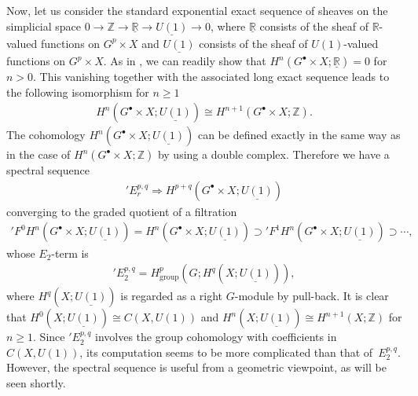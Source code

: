 \documentclass[pdftex]{sigma}
\theoremstyle{definition}
\newcommand{\R}{\mathbb{R}}
\newcommand{\Z}{\mathbb{Z}}
\begin{document}
Now, let us consider the standard exponential exact sequence of sheaves on the simplicial space
$0 \to \Z \to \underline{\R} \to \underline{U(1)} \to 0$, where $\underline{\R}$ consists of the sheaf of $\R$-valued functions on $G^p \times X$ and $\underline{U(1)}$ consists of the sheaf of $U(1)$-valued functions on $G^p \times X$. As in \cite[Lemma~4.4]{G2}, we can readily show that $H^n(G^\bullet \times X; \underline{\R}) = 0$ for $n > 0$. This vanishing together with the associated long exact sequence leads to the following isomorphism for $n \ge 1$
\begin{gather*}
H^{n}(G^\bullet \times X; \underline{U(1)}) \cong H^{n+1}(G^\bullet \times X; \Z).
\end{gather*}
The cohomology $H^{n}(G^\bullet \times X; \underline{U(1)})$ can be def\/ined exactly in the same way as in the case of $H^n(G^\bullet \times X; \Z)$ by using a double complex. Therefore we have a spectral sequence
\begin{gather*}
{}'E^{p, q}_r \Longrightarrow H^{p+q}(G^\bullet \times X; \underline{U(1)})
\end{gather*}
converging to the graded quotient of a f\/iltration
\begin{gather*}
{}'F^0H^n(G^\bullet \times X; \underline{U(1)})
= H^n(G^\bullet \times X; \underline{U(1)}) \supset
{}'F^1H^n(G^\bullet \times X; \underline{U(1)}) \supset
\cdots,
\end{gather*}
whose $E_2$-term is
\begin{gather*}
{}'E_2^{p, q} = H^p_{\mathrm{group}}(G; H^q(X; \underline{U(1)})),
\end{gather*}
where $H^q(X; \underline{U(1)})$ is regarded as a right $G$-module by pull-back. It is clear that $H^0(X; \underline{U(1)}) \cong C(X, U(1))$ and $H^n(X; \underline{U(1)}) \cong H^{n+1}(X; \Z)$ for $n \ge 1$. Since ${}'E_2^{p, q}$ involves the group cohomology with coef\/f\/icients in $C(X, U(1))$, its computation seems to be more complicated than that of~$E_2^{p, q}$. However, the spectral sequence is useful from a geometric viewpoint, as will be seen shortly.
\end{document}
